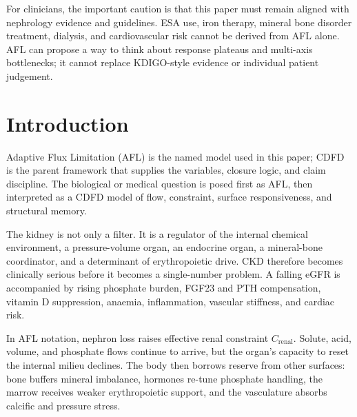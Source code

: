 \documentclass[12pt,a4paper]{article}
\begin{document}
For clinicians, the important caution is that this paper must remain aligned with nephrology evidence and guidelines. ESA use, iron therapy, mineral bone disorder treatment, dialysis, and cardiovascular risk cannot be derived from AFL alone. AFL can propose a way to think about response plateaus and multi-axis bottlenecks; it cannot replace KDIGO-style evidence or individual patient judgement.


\vspace{0.5em}\noindent{}
\vspace{0.75em}

\section{Introduction}

Adaptive Flux Limitation (AFL) is the named model used in this paper; CDFD is the parent framework that supplies the variables, closure logic, and claim discipline. The biological or medical question is posed first as AFL, then interpreted as a CDFD model of flow, constraint, surface responsiveness, and structural memory.

The kidney is not only a filter. It is a regulator of the internal chemical environment, a pressure-volume organ, an endocrine organ, a mineral-bone coordinator, and a determinant of erythropoietic drive. CKD therefore becomes clinically serious before it becomes a single-number problem. A falling eGFR is accompanied by rising phosphate burden, FGF23 and PTH compensation, vitamin D suppression, anaemia, inflammation, vascular stiffness, and cardiac risk.

In AFL notation, nephron loss raises effective renal constraint $C_{\mathrm{renal}}$. Solute, acid, volume, and phosphate flows continue to arrive, but the organ's capacity to reset the internal milieu declines. The body then borrows reserve from other surfaces: bone buffers mineral imbalance, hormones re-tune phosphate handling, the marrow receives weaker erythropoietic support, and the vasculature absorbs calcific and pressure stress.
\end{document}
